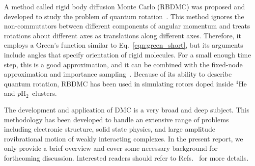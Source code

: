 \documentclass[12pt]{iopart}
\newcommand{\phtwo}{{\em p}H$_2$}
\begin{document}
A method called rigid body diffusion Monte Carlo (RBDMC) was proposed and developed to study the problem of quantum rotation~\cite{buch_rbdmc}. This method ignores the non-commutators between different components of angular momentum and treats rotations about different axes as translations along different axes. Therefore, it employs a Green's function similar to Eq.~\ref{eqn:green_short}, but its arguments include angles that specify orientation of rigid molecules. 
For a small enough time step, this is a good approximation, and it can be combined with the fixed-node approximation and importance sampling~\cite{niyaz_arnhf,whaley_SF6,viel_isrbdmc}. Because of its ability to describe quantum rotation, RBDMC has been used in simulating rotors doped inside $^4$He and \phtwo~clusters.

The development and application of DMC is a very broad and deep subject. 
This methodology has been developed to handle an extensive range of problems including electronic structure, solid state physics, and large amplitude rovibrational motion of weakly interacting complexes.
In the present report, we only provide a brief overview and cover some necessary background for forthcoming discussion. Interested readers should refer to Refs.~\cite{barnett_dmc_93,foulkes_qmc_review,anderson_dmc,hammond_mc_in_qc,mccoy_dmc_irpc, mccoy_dmc_2006,needs_dmc_2010,mccoy_dmc_2012} for more details.
\end{document}
